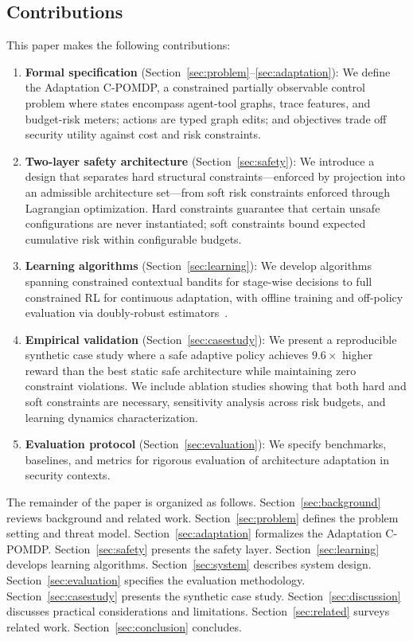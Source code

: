 \documentclass[sigconf,anonymous]{acmart}
\newcommand{\secref}[1]{Section~\ref{#1}}
\begin{document}
\subsection{Contributions}

This paper makes the following contributions:

\begin{enumerate}
\item \textbf{Formal specification} (\secref{sec:problem}--\ref{sec:adaptation}): We define the Adaptation C-POMDP, a constrained partially observable control problem where states encompass agent-tool graphs, trace features, and budget-risk meters; actions are typed graph edits; and objectives trade off security utility against cost and risk constraints.

\item \textbf{Two-layer safety architecture} (\secref{sec:safety}): We introduce a design that separates hard structural constraints---enforced by projection into an admissible architecture set---from soft risk constraints enforced through Lagrangian optimization. Hard constraints guarantee that certain unsafe configurations are never instantiated; soft constraints bound expected cumulative risk within configurable budgets.

\item \textbf{Learning algorithms} (\secref{sec:learning}): We develop algorithms spanning constrained contextual bandits for stage-wise decisions to full constrained RL for continuous adaptation, with offline training and off-policy evaluation via doubly-robust estimators~\cite{jiang2016doublyrobust}.

\item \textbf{Empirical validation} (\secref{sec:casestudy}): We present a reproducible synthetic case study where a safe adaptive policy achieves $9.6\times$ higher reward than the best static safe architecture while maintaining zero constraint violations. We include ablation studies showing that both hard and soft constraints are necessary, sensitivity analysis across risk budgets, and learning dynamics characterization.

\item \textbf{Evaluation protocol} (\secref{sec:evaluation}): We specify benchmarks, baselines, and metrics for rigorous evaluation of architecture adaptation in security contexts.
\end{enumerate}

The remainder of the paper is organized as follows. \secref{sec:background} reviews background and related work. \secref{sec:problem} defines the problem setting and threat model. \secref{sec:adaptation} formalizes the Adaptation C-POMDP. \secref{sec:safety} presents the safety layer. \secref{sec:learning} develops learning algorithms. \secref{sec:system} describes system design. \secref{sec:evaluation} specifies the evaluation methodology. \secref{sec:casestudy} presents the synthetic case study. \secref{sec:discussion} discusses practical considerations and limitations. \secref{sec:related} surveys related work. \secref{sec:conclusion} concludes.
\end{document}
